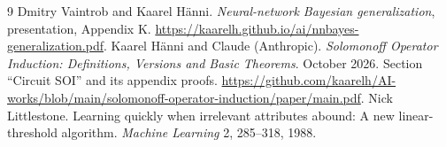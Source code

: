 \documentclass[11pt]{article}
\begin{document}
\begin{thebibliography}{9}
 Dmitry Vaintrob and Kaarel H\"anni.
\emph{Neural-network Bayesian generalization}, presentation, Appendix K.
\url{https://kaarelh.github.io/ai/nnbayes-generalization.pdf}.
 Kaarel H\"anni and Claude (Anthropic).
\emph{Solomonoff Operator Induction: Definitions, Versions and Basic Theorems}.
October 2026. Section ``Circuit SOI'' and its appendix proofs.
\url{https://github.com/kaarelh/AI-works/blob/main/solomonoff-operator-induction/paper/main.pdf}.
 Nick Littlestone.
Learning quickly when irrelevant attributes abound: A new linear-threshold
algorithm. \emph{Machine Learning} 2, 285--318, 1988.
\end{thebibliography}
\end{document}
